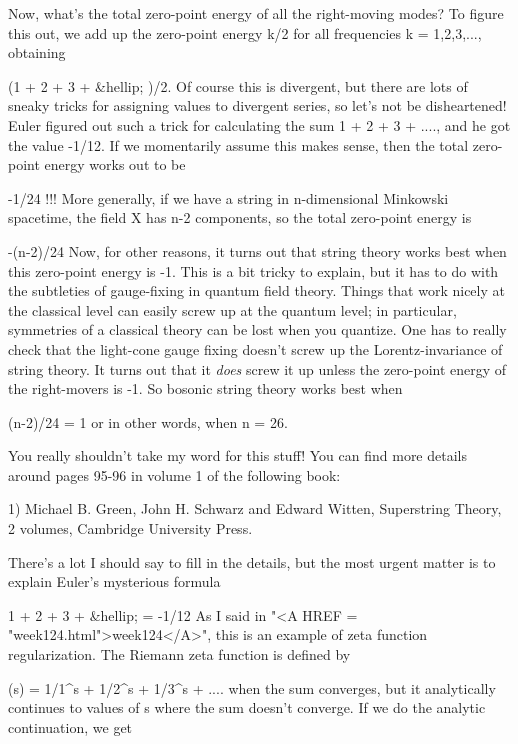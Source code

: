Now, what's the total zero-point energy of all the right-moving modes?
To figure this out, we add up the zero-point energy k/2 for all
frequencies k = 1,2,3,..., obtaining

                     (1 + 2 + 3 + &hellip; )/2.
Of course this is divergent, but there are lots of sneaky tricks for
assigning values to divergent series, so let's not be disheartened!  
Euler figured out such a trick for calculating the sum 1 + 2 + 3 + ....,
and he got the value -1/12.  If we momentarily assume this makes sense,
then the total zero-point energy works out to be

                            -1/24 !!!
More generally, if we have a string in n-dimensional Minkowski spacetime,
the field X has n-2 components, so the total zero-point energy is

                           -(n-2)/24
Now, for other reasons, it turns out that string theory works best when
this zero-point energy is -1.  This is a bit tricky to explain, but it
has to do with the subtleties of gauge-fixing in quantum field theory.
Things that work nicely at the classical level can easily screw up at
the quantum level; in particular, symmetries of a classical theory can
be lost when you quantize.  One has to really check that the light-cone
gauge fixing doesn't screw up the Lorentz-invariance of string theory. 
It turns out that it \emph{does} screw it up unless the zero-point energy of
the right-movers is -1.  So bosonic string theory works best when

                          (n-2)/24 = 1
or in other words, when n = 26.

You really shouldn't take my word for this stuff!  You can find more 
details around pages 95-96 in volume 1 of the following book:

1) Michael B. Green, John H. Schwarz and Edward Witten, Superstring Theory,
2 volumes, Cambridge University Press.

There's a lot I should say to fill in the details, but the most urgent 
matter is to explain Euler's mysterious formula

                      1 + 2 + 3 + &hellip; = -1/12
As I said in "<A HREF = "week124.html">week124</A>", this is an example of zeta function regularization.  
The Riemann zeta function is defined by

                      \zeta (s) = 1/1^{s} + 1/2^{s} + 1/3^{s} + ....
when the sum converges, but it analytically continues to values of s where 
the sum doesn't converge.  If we do the analytic continuation, we get 

